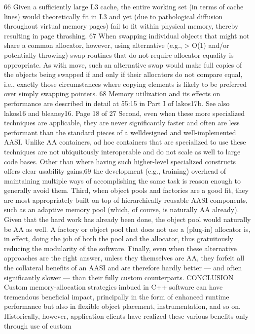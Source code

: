 66 Given a sufficiently large L3 cache, the entire working set (in terms of cache lines) would
theoretically fit in L3 and yet (due to pathological diffusion throughout virtual memory pages) fail to
fit within physical memory, thereby resulting in page thrashing.
67 When swapping individual objects that might not share a common allocator, however, using
alternative (e.g., > O(1) and/or potentially throwing) swap routines that do not require allocator
equality is appropriate. As with move, such an alternative swap would make full copies of the objects
being swapped if and only if their allocators do not compare equal, i.e., exactly those circumstances
where copying elements is likely to be preferred over simply swapping pointers.
68 Memory utilization and its effects on performance are described in detail at 55:15 in Part I of
lakos17b. See also lakos16 and bleaney16.
Page 18 of 27
Second, even when these more specialized techniques are applicable, they are never
significantly faster and often are less performant than the standard pieces of a welldesigned and well-implemented AASI. Unlike AA containers, ad hoc containers that
are specialized to use these techniques are not ubiquitously interoperable and do
not scale as well to large code bases. Other than where having such higher-level
specialized constructs offers clear usability gains,69 the development (e.g., training)
overhead of maintaining multiple ways of accomplishing the same task is reason
enough to generally avoid them.
Third, when object pools and factories are a good fit, they are most appropriately
built on top of hierarchically reusable AASI components, such as an adaptive
memory pool (which, of course, is naturally AA already). Given that the hard work
has already been done, the object pool would naturally be AA as well. A factory or
object pool that does not use a (plug-in) allocator is, in effect, doing the job of both
the pool and the allocator, thus gratuitously reducing the modularity of the
software.
Finally, even when these alternative approaches are the right answer, unless they
themselves are AA, they forfeit all the collateral benefits of an AASI and are therefore
hardly better — and often significantly slower — than their fully custom
counterparts.
CONCLUSION
Custom memory-allocation strategies imbued in C++ software can have tremendous
beneficial impact, principally in the form of enhanced runtime performance but also
in flexible object placement, instrumentation, and so on. Historically, however,
application clients have realized these various benefits only through use of custom
